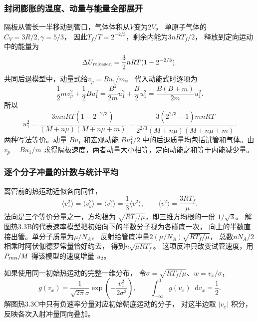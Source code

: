 \documentclass[UTF8,fontset=fandol,a4paper,11pt]{ctexart}
\newcommand{\dd}{\mathop{}\!\mathrm{d}}
\begin{document}
\subsubsection*{封闭膨胀的温度、动量与能量全部展开}
隔板从管长一半移动到管口，气体体积从$V$变为$2V$。
单原子气体的$C_V=3R/2,\gamma=5/3$，
因此$T_f/T=2^{-2/3}$，剩余内能为$3nRT_f/2$，
释放到定向运动中的能量为
\[
\Delta U_{\rm released}
=\frac32nRT(1-2^{-2/3}).
\]
共同后退模型中，动量式给$v_p=Bu_1/m$。
代入动能式时逐项为
\[
\frac12mv_p^2+\frac12Bu_1^2
=\frac{B^2}{2m}u_1^2+\frac B2u_1^2
=\frac{B(B+m)}{2m}u_1^2.
\]
所以
\[
u_1^2=\frac{3mnRT(1-2^{-2/3})}
{(M+n\mu)(M+n\mu+m)}
=\frac{3(2^{2/3}-1)mnRT}
{2^{2/3}(M+n\mu)(M+n\mu+m)}.
\]
两种写法等价。动量 $Bu_1$ 和宏观动能 $Bu_1^2/2$ 中的后退质量均包括试管和气体。由 $v_p=Bu_1/m$ 求得隔板速度，两者动量大小相等，定向动能之和等于内能减少量。

\subsubsection*{逐个分子冲量的计数与统计平均}
离管前的热运动近似各向同性，
\[
\langle v_x^2\rangle=\langle v_y^2\rangle
=\langle v_z^2\rangle=\frac13\langle v^2\rangle,\qquad
\langle v^2\rangle=\frac{3RT_f}{\mu}.
\]
法向是三个等价分量之一，方均根为 $\sqrt{RT_f/\mu}$，即三维方均根的一份 $1/\sqrt3$。
解图热3.3B的代表速率模型把初始向下的半数分子视为各碰底一次，
向上的半数直接出管。单分子质量为$\mu/N_A$，
反射给管底冲量$2(\mu/N_A)\sqrt{RT_f/\mu}$，
总数$nN_A/2$相乘时阿伏伽德罗常量恰好约去，
得到$n\sqrt{\mu RT_f}$。
这项反冲只改变试管速度，用 $P_{\rm rms}/M$ 得该模型的速度增量 $u_2$。

如果使用同一初始热运动的完整一维分布，
令$\sigma=\sqrt{RT_f/\mu}$、$w=v_x/\sigma$，
\[
g(v_x)=\frac{1}{\sqrt{2\pi}\sigma}
\exp\!\left(-\frac{v_x^2}{2\sigma^2}\right),\qquad
\int_{-\infty}^{0}g(v_x)\dd v_x=\frac12.
\]
解图热3.3C中只有负速率分量对应初始朝底运动的分子，
对这半边取 $|v_x|$ 积分，反映各次入射冲量同向叠加。
\end{document}

